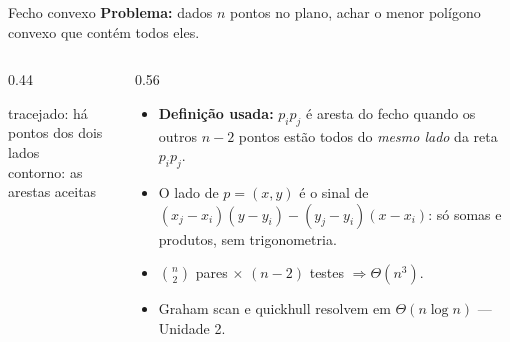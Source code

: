 \documentclass[aspectratio=169]{beamer}
\begin{document}
\begin{frame}{Fecho convexo}
  \textbf{Problema:} dados $n$ pontos no plano, achar o menor polígono convexo
  que contém todos eles.

  \begin{columns}[T]
    \begin{column}{0.44\textwidth}
      \begin{center}
      \end{center}
      \begin{center}\scriptsize
      tracejado: há pontos dos dois lados\\
      contorno: as arestas aceitas
      \end{center}
    \end{column}
    \begin{column}{0.56\textwidth}
      \begin{itemize}
        \item \textbf{Definição usada:} $p_ip_j$ é aresta do fecho quando os
          outros $n-2$ pontos estão todos do \emph{mesmo lado} da reta $p_ip_j$.
        \item O lado de $p=(x,y)$ é o sinal de
          $(x_j-x_i)(y-y_i)-(y_j-y_i)(x-x_i)$: só somas e produtos, sem
          trigonometria.
        \item $\binom{n}{2}$ pares $\times$ $(n-2)$ testes $\Rightarrow \Theta(n^3)$.
        \item Graham scan e quickhull resolvem em $\Theta(n\log n)$ --- Unidade 2.
      \end{itemize}
    \end{column}
  \end{columns}
\end{frame}
\end{document}
